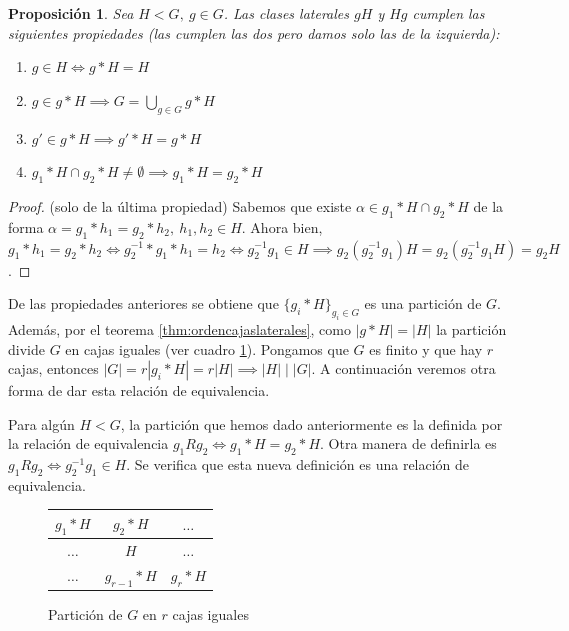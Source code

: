 \documentclass{book}
\newtheorem{pro}{Proposición}
\theoremstyle{definition}
\theoremstyle{remark}
\newcommand{\inv}[1]{#1^{-1}}
\begin{document}
\begin{pro}
	Sea $H < G,\ g \in G$. Las clases laterales $gH$ y $Hg$ cumplen las siguientes propiedades (las cumplen las dos pero damos solo las de la izquierda):
	\begin{enumerate}
		\item $g \in H \iff g\ast H = H$
		\item $g \in g \ast H \implies G = \bigcup_{g \in G} g \ast H$
		\item $g' \in g \ast H \implies g' \ast H = g \ast H$
		\item $g_1 \ast H \cap g_2 \ast H \neq \emptyset \implies g_1 \ast H = g_2 \ast H$
	\end{enumerate}
\end{pro}

\begin{proof}
	(solo de la última propiedad)
	Sabemos que existe $\alpha \in g_1 \ast H \cap g_2 \ast H$ de la forma $\alpha = g_1 \ast h_1 = g_2 \ast h_2,\ h_1, h_2 \in H$. Ahora bien, $g_1 \ast h_1 = g_2 \ast h_2 \iff \inv{g_2} \ast g_1 \ast h_1 = h_2 \iff \inv{g_2}g_1 \in H \implies g_2(\inv{g_2}g_1)H = g_2(\inv{g_2}g_1H) = g_2 H$.
\end{proof}

De las propiedades anteriores se obtiene que $\{g_i \ast H\}_{g_i \in G}$ es una partición de $G$. Además, por el teorema \ref{thm:ordencajaslaterales}, como $|g \ast H| = |H|$ la partición divide $G$ en cajas iguales (ver cuadro \ref{table:cajasiguales}). Pongamos que $G$ es finito y que hay $r$ cajas, entonces $|G| = r|g_i \ast H| = r|H| \implies |H| \mid |G|$. A continuación veremos otra forma de dar esta relación de equivalencia.


Para algún $H < G$, la partición que hemos dado anteriormente es la definida por la relación de equivalencia $g_1 R g_2 \iff g_1 \ast H = g_2 \ast H$. Otra manera de definirla es $g_1 R g_2 \iff \inv{g_2}g_1 \in H$. Se verifica que esta nueva definición es una relación de equivalencia.

\begin{figure}[h]
	\centering
	\renewcommand{\arraystretch}{1.5}
	\begin{tabular}{|c|c|c|}
		\hline
		$g_1 \ast H$ & $g_2 \ast H$ & $\dots$ \\\hline
		$\dots$ & $H$ & $\dots$ \\\hline
		$\dots$ & $g_{r-1} \ast H$ & $g_r \ast H$\\\hline
	\end{tabular}
	\caption{Partición de $G$ en $r$ cajas iguales}
	\label{table:cajasiguales}
\end{figure}
\end{document}
